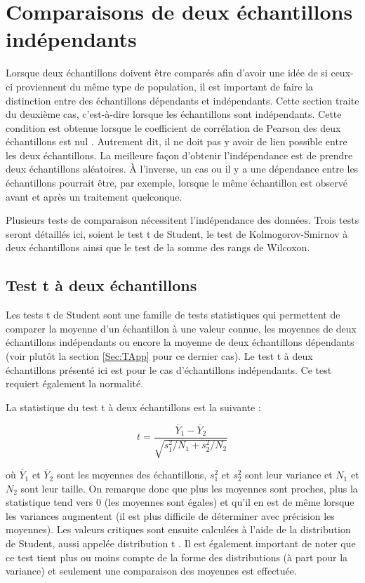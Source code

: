 \documentclass{article}       %
\begin{document}
\section{Comparaisons de deux échantillons indépendants}
\label{Sec:Indep}

Lorsque deux échantillons doivent être comparés afin d'avoir une idée de si ceux-ci proviennent du même type de population, il est important de faire la distinction entre des échantillons dépendants et indépendants. Cette section traite du deuxième cas, c'est-à-dire lorsque les échantillons sont indépendants. Cette condition est obtenue lorsque le coefficient de corrélation de Pearson des deux échantillons est nul \cite{ComparingSamples}. Autrement dit, il ne doit pas y avoir de lien possible entre les deux échantillons. La meilleure façon d'obtenir l'indépendance est de prendre deux échantillons aléatoires. À l'inverse, un cas ou il y a une dépendance entre les échantillons pourrait être, par exemple, lorsque le même échantillon est observé avant et après un traitement quelconque.

Plusieurs tests de comparaison nécessitent l'indépendance des données. Trois tests seront détaillés ici, soient le test t de Student, le test de Kolmogorov-Smirnov à deux échantillons ainsi que le test de la somme des rangs de Wilcoxon.

\subsection{Test t à deux échantillons}

Les tests t de Student sont une famille de tests statistiques qui permettent de comparer la moyenne d'un échantillon à une valeur connue, les moyennes de deux échantillons indépendants ou encore la moyenne de deux échantillons dépendants (voir plutôt la section \ref{Sec:TApp} pour ce dernier cas). Le test t à deux échantillons présenté ici est pour le cas d'échantillons indépendants. Ce test requiert également la normalité.

La statistique du test t à deux échantillons est la suivante \cite{TwoSampT}:

\begin{equation}
\label{Eq:TTest}
    t = \frac{\overline{Y}_{1}-\overline{Y}_{2}}{\sqrt{s_{1}^{2}/N_{1}+s_{2}^{2}/N_{2}}}
\end{equation}

où $\overline{Y}_{1}$ et $\overline{Y}_{2}$ sont les moyennes des échantillons, $s_{1}^{2}$ et $s_{2}^{2}$ sont leur variance et $N_1$ et $N_2$ sont leur taille. On remarque donc que plus les moyennes sont proches, plus la statistique tend vers 0 (les moyennes sont égales) et qu'il en est de même lorsque les variances augmentent (il est plus difficile de déterminer avec précision les moyennes). Les valeurs critiques sont ensuite calculées à l'aide de la distribution de Student, aussi appelée distribution t \cite{TwoSampT}. Il est également important de noter que ce test tient plus ou moins compte de la forme des distributions (à part pour la variance) et seulement une comparaison des moyennes est effectuée.
\end{document}
